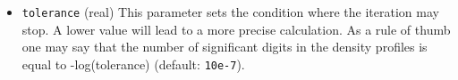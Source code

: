 \documentclass{article}
\newcommand{\namics}{{\tt namics}}
\begin{document}
\begin{itemize}





\item{\tt tolerance} (real) This parameter sets the condition where the iteration may stop.  A lower value will lead to a more precise calculation.  As a rule of thumb one may say that the number of significant digits in the density profiles is equal to -log(tolerance) (default: {\tt 10e-7}).


\end{itemize}
\end{document}
